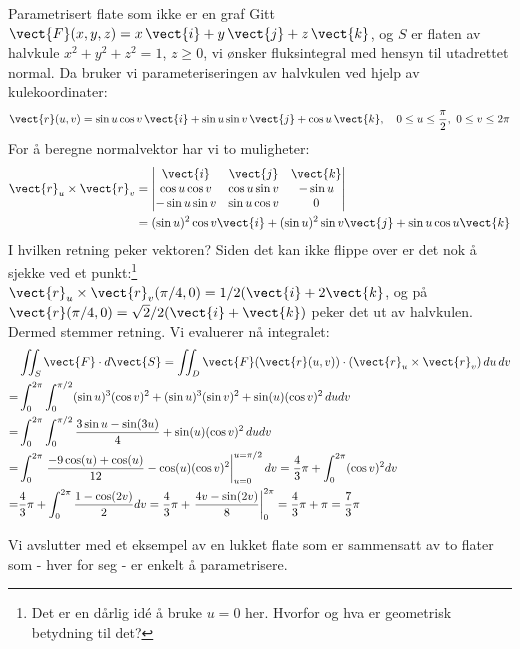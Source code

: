 \begin{eks}{Parametrisert flate som ikke er en graf}\label{ex:halvkule}
Gitt \( \vect{F}(x, y, z) = x\, \vect{i} + y\, \vect{j} + z\, \vect{k} \), og \( S \) er flaten av halvkule \( x^2 + y^2 + z^2 = 1 \), \( z \geq 0 \), vi ønsker fluksintegral med hensyn til utadrettet normal.
Da bruker vi parameteriseringen av halvkulen ved hjelp av kulekoordinater:
\[
\vect{r}(u, v) = \sin u \cos v\, \vect{i} + \sin u \sin v\, \vect{j} + \cos u\, \vect{k}, \quad 0 \leq u \leq \frac{\pi}{2},\ 0 \leq v \leq 2\pi
\]
For å beregne normalvektor har vi to muligheter: 
\begin{align*}
\vect{r}_u \times \vect{r}_v &= \begin{vmatrix}
   \vect{i} & \vect{j} & \vect{k} \\
   \cos u \cos v & \cos u \sin v & - \sin u \\
   -\sin u \sin v & \sin u \cos v & 0 
\end{vmatrix} \\&= (\sin u)^2\cos v \vect{i}+(\sin u)^2\sin v \vect{j}+\sin u  \cos u \vect{k}
\end{align*}
I hvilken retning peker vektoren? Siden det  kan ikke flippe over er det nok å sjekke ved et punkt:\footnote{Det er en dårlig id\'{e} å bruke $u=0$ her. Hvorfor og hva er geometrisk betydning til det?} $\vect{r}_u \times \vect{r}_v (\pi/4,0)= 1/2(\vect{i}+2\vect{k}$, og på $\vect{r}(\pi/4,0)=\sqrt{2}/2(\vect{i}+\vect{k})$ peker det ut av halvkulen. Dermed stemmer retning. Vi evaluerer nå integralet:
\begin{align*}
&\iint_S \vect{F} \cdot d\vect{S} = \iint_D \vect{F}(\vect{r}(u,v)) \cdot (\vect{r}_u \times \vect{r}_v)\, du\, dv\\
=& \int_0^{2\pi}\int_0^{\pi/2} (\sin u)^3(\cos v)^2 + (\sin u)^3(\sin v)^2 + \sin (u)(\cos v)^2 \, du dv \\ =& \int_0^{2\pi}\int_0^{\pi/2} \frac{3\sin u - \sin (3u)}{4} + \sin (u)(\cos v)^2 \, du dv \\ =& \int_0^{2\pi}\left. \frac{-9\cos (u) +\cos (u)}{12}-\cos (u)(\cos v)^2\right|_{u=0}^{u=\pi/2} dv = \frac{4}{3}\pi + \int_0^{2\pi}
 (\cos v)^2 dv\\
 =& \frac{4}{3}\pi + \int_0^{2\pi} \frac{1-\cos (2v)}{2} dv =  \frac{4}{3}\pi+ \left. \frac{4v-\sin (2v)}{8}\right|_{0}^{2\pi} = \frac{4}{3}\pi+\pi = \frac{7}{3}\pi \end{align*}
\end{eks}
%
Vi avslutter med et eksempel av en lukket flate som er sammensatt av to flater som - hver for seg - er enkelt å parametrisere.
